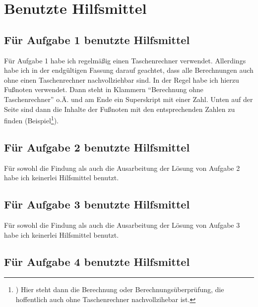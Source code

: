 
\section*{Benutzte Hilfsmittel}

\subsection*{Für Aufgabe 1 benutzte Hilfsmittel}

Für Aufgabe 1 habe ich regelmäßig einen Taschenrechner verwendet. Allerdings habe ich in der endgültigen Fassung 
darauf geachtet, dass alle Berechnungen auch ohne einen Taschenrechner nachvollziehbar sind. In der Regel habe 
ich hierzu Fußnoten verwendet. Dann steht in Klammern "`Berechnung ohne Taschenrechner"' o.Ä. und am Ende ein 
Superskript mit einer Zahl. Unten auf der Seite sind dann die Inhalte der Fußnoten mit  den entsprechenden Zahlen 
zu finden (Beispiel\footnote{) Hier steht dann die Berechnung oder Berechnungsüberprüfung, die hoffentlich auch ohne 
Taschenrechner nachvollzihebar ist.}).


\subsection*{Für Aufgabe 2 benutzte Hilfsmittel}

Für sowohl die Findung als auch die Ausarbeitung der Lösung von Aufgabe 2 habe ich keinerlei Hilfsmittel benutzt.

\subsection*{Für Aufgabe 3 benutzte Hilfsmittel}

Für sowohl die Findung als auch die Ausarbeitung der Lösung von Aufgabe 3 habe ich keinerlei Hilfsmittel benutzt.

\subsection*{Für Aufgabe 4 benutzte Hilfsmittel}

